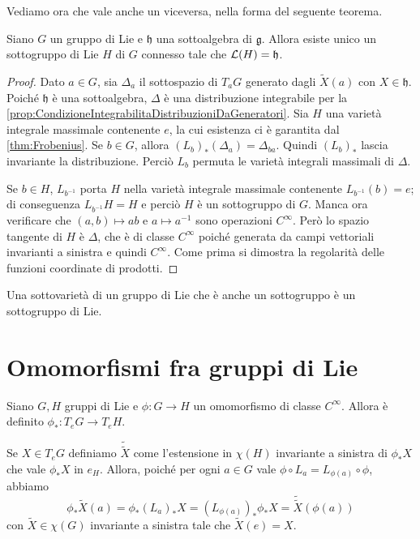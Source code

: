Vediamo ora che vale anche un viceversa, nella forma del seguente teorema.
\begin{theorem}
	Siano $G$ un gruppo di Lie e $\mathfrak h$ una sottoalgebra di $\mathfrak g$. Allora esiste unico un sottogruppo di Lie $H$ di $G$ connesso tale che $\mathcal L (H) = \mathfrak h$.
\end{theorem}
\begin{proof} %
	Dato $a \in G$, sia $\Delta_a$ il sottospazio di $T_aG$ generato dagli $\tilde X(a)$ con $X\in \mathfrak h$.
	Poiché $\mathfrak h$ è una sottoalgebra, $\Delta$ è una distribuzione integrabile per la \cref{prop:CondizioneIntegrabilitaDistribuzioniDaGeneratori}.
	Sia $H$ una varietà integrale massimale contenente $e$, la cui esistenza ci è garantita dal \cref{thm:Frobenius}. Se $b \in G$, allora $(L_b)_* (\Delta_a) = \Delta_{ba}$. Quindi $(L_b)_*$ lascia invariante la distribuzione. Perciò $L_b$ permuta le varietà integrali massimali di $\Delta$.
	
	Se $b\in H$, $L_{b^{-1}}$ porta $H$ nella varietà integrale massimale contenente $L_{b^{-1}} (b) =e$; di conseguenza $L_{b^{-1}} H = H$ e perciò $H$ è un sottogruppo di $G$.
	Manca ora verificare che $(a,b) \mapsto ab$ e $a\mapsto a^{-1}$ sono operazioni $C^\infty$.
	Però lo spazio tangente di $H$ è $\Delta$, che è di classe $C^\infty$ poiché generata da campi vettoriali invarianti a sinistra e quindi $C^\infty$.
	Come prima si dimostra la regolarità delle funzioni coordinate di prodotti.
\end{proof}

\begin{remark}
	Una sottovarietà di un gruppo di Lie che è anche un sottogruppo è un sottogruppo di Lie.
\end{remark}

\section{Omomorfismi fra gruppi di Lie}

Siano $G,H$ gruppi di Lie e $\phi : G\to H$ un omomorfismo di classe $C^\infty$.
Allora è definito $\phi_* : T_eG \to T_eH$.

Se $X \in T_eG$ definiamo $\tilde{\tilde X}$ come l'estensione in $\chi(H)$ invariante a sinistra di $\phi_*X $ che vale $\phi_*X$ in $e_H$.
Allora, poiché per ogni $a \in G$ vale $\phi \circ L_a = L_{\phi(a)} \circ \phi$, abbiamo 
\begin{equation*}
\phi_* \tilde X(a) = \phi_* (L_a)_*X = (L_{\phi(a)})_* \phi_*X = \tilde{\tilde X} (\phi(a))
\end{equation*}
con $\tilde X\in\chi(G)$ invariante a sinistra tale che $\tilde X(e) = X$.

